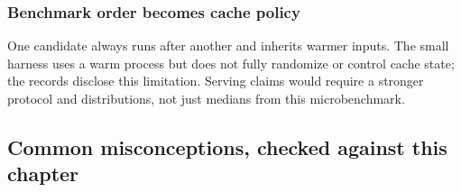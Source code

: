 \documentclass[
  10pt,
]{article}
\begin{document}
\subsubsection{Benchmark order becomes cache
policy}\label{benchmark-order-becomes-cache-policy}

One candidate always runs after another and inherits warmer inputs. The
small harness uses a warm process but does not fully randomize or
control cache state; the records disclose this limitation. Serving
claims would require a stronger protocol and distributions, not just
medians from this microbenchmark.

\subsection{Common misconceptions, checked against this
chapter}\label{common-misconceptions-checked-against-this-chapter}
\end{document}
